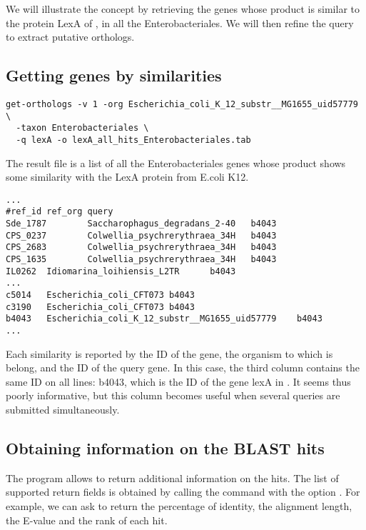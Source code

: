 We will illustrate the concept by retrieving the genes whose product
is similar to the protein LexA of , in
all the Enterobacteriales. We will then refine the query to extract
putative orthologs.

\subsection{Getting genes by similarities}

\begin{footnotesize}
\begin{verbatim}
get-orthologs -v 1 -org Escherichia_coli_K_12_substr__MG1655_uid57779 \
  -taxon Enterobacteriales \
  -q lexA -o lexA_all_hits_Enterobacteriales.tab 
\end{verbatim}
\end{footnotesize}

The result file is a list of all the Enterobacteriales genes whose
product shows some similarity with the LexA protein from E.coli K12.

\begin{scriptsize}
\begin{verbatim}
...
#ref_id ref_org query
Sde_1787        Saccharophagus_degradans_2-40   b4043
CPS_0237        Colwellia_psychrerythraea_34H   b4043
CPS_2683        Colwellia_psychrerythraea_34H   b4043
CPS_1635        Colwellia_psychrerythraea_34H   b4043
IL0262  Idiomarina_loihiensis_L2TR      b4043
...
c5014   Escherichia_coli_CFT073 b4043
c3190   Escherichia_coli_CFT073 b4043
b4043   Escherichia_coli_K_12_substr__MG1655_uid57779    b4043
...
\end{verbatim}
\end{scriptsize}

Each similarity is reported by the ID of the gene, the organism to
which is belong, and the ID of the query gene. In this case, the third
column contains the same ID on all lines: b4043, which is the ID of
the gene lexA in \org{Escherichia coli K12}. It seems thus poorly
informative, but this column becomes useful when several queries are
submitted simultaneously.

\subsection{Obtaining information on the BLAST hits}

The program  allows to return additional
information on the hits. The list of supported return fields is
obtained by calling the command with the option \option{-help}. For
example, we can ask to return the percentage of identity, the
alignment length, the E-value and the rank of each hit.

